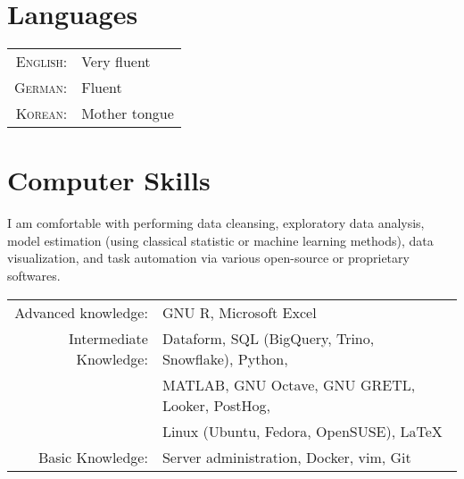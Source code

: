\documentclass[a4paper,10pt]{article} %
\begin{document}
\section{Languages}

\begin{tabular}{rl}
\textsc{English:} & Very fluent\\

\textsc{German:} & Fluent\\

\textsc{Korean:} & Mother tongue\\

\end{tabular}


\section{Computer Skills}

I am comfortable with performing data cleansing, exploratory data analysis,
model estimation (using classical statistic or machine learning methods),
data visualization, and task automation via various open-source or proprietary
softwares.

\begin{tabular}{rl}
Advanced knowledge: & GNU R, Microsoft Excel\\
Intermediate Knowledge: & Dataform, SQL (BigQuery, Trino, Snowflake), Python,
\\&MATLAB, GNU Octave, GNU GRETL, Looker, PostHog,
\\&Linux (Ubuntu, Fedora, OpenSUSE), \LaTeX\\
Basic Knowledge: & Server administration, Docker, vim, Git\\
\end{tabular}
\end{document}
